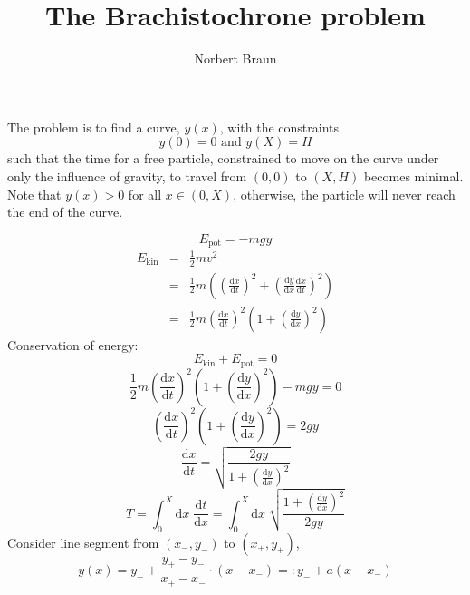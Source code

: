 \documentclass[a4paper]{article}
\begin{document}
\title{The Brachistochrone problem}
\author{Norbert Braun}
\maketitle
The problem is to find a curve, $y(x)$, with the constraints
\begin{equation}
y(0) = 0\mbox{ and }y(X) = H
\end{equation}
such that the time for a free particle, constrained to move on the curve under only the influence of gravity, to travel from $(0,0)$ to $(X,H)$ becomes minimal. Note that $y(x) > 0$ for all $x \in (0,X)$, otherwise, the particle will never reach the end of the curve.

\begin{equation}
E_\mathrm{pot} = -mgy
\end{equation}
\begin{eqnarray}
E_\mathrm{kin} &=& \frac{1}{2} m v^2 \\
&=& \frac{1}{2} m \left( \left(\frac{\mathrm{d}x}{\mathrm{d}t}\right)^2
+ \left(\frac{\mathrm{d}y}{\mathrm{d}x}\frac{\mathrm{d}x}{\mathrm{d}t}\right)^2 \right)\\
&=& \frac{1}{2} m \left(\frac{\mathrm{d}x}{\mathrm{d}t}\right)^2
\left(1 + \left(\frac{\mathrm{d}y}{\mathrm{d}x}\right)^2\right)
\end{eqnarray}
Conservation of energy:
\begin{equation}
E_\mathrm{kin} + E_\mathrm{pot} = 0
\end{equation}
\begin{equation}
\frac{1}{2} m \left(\frac{\mathrm{d}x}{\mathrm{d}t}\right)^2
\left(1 + \left(\frac{\mathrm{d}y}{\mathrm{d}x}\right)^2\right) - mgy = 0
\end{equation}
\begin{equation}
\left(\frac{\mathrm{d}x}{\mathrm{d}t}\right)^2
\left(1 + \left(\frac{\mathrm{d}y}{\mathrm{d}x}\right)^2\right) = 2gy
\end{equation}
\begin{equation}
\frac{\mathrm{d}x}{\mathrm{d}t} = \sqrt{\frac{2gy}{1+\left(\frac{\mathrm{d}y}{\mathrm{d}x}\right)^2}}
\end{equation}
\begin{equation}
T = \int_0^X \mathrm{d}x\;\frac{\mathrm{d}t}{\mathrm{d}x}
= \int_0^X \mathrm{d}x\;\sqrt{\frac{1+\left(\frac{\mathrm{d}y}{\mathrm{d}x}\right)^2}{2gy}}
\end{equation}
Consider line segment from $(x_-, y_-)$ to $(x_+, y_+)$,
\begin{equation}
y(x) = y_- + \frac{y_+ - y_-}{x_+ - x_-}\cdot(x-x_-)
=: y_- + a(x - x_-)
\end{equation}
\end{document}
